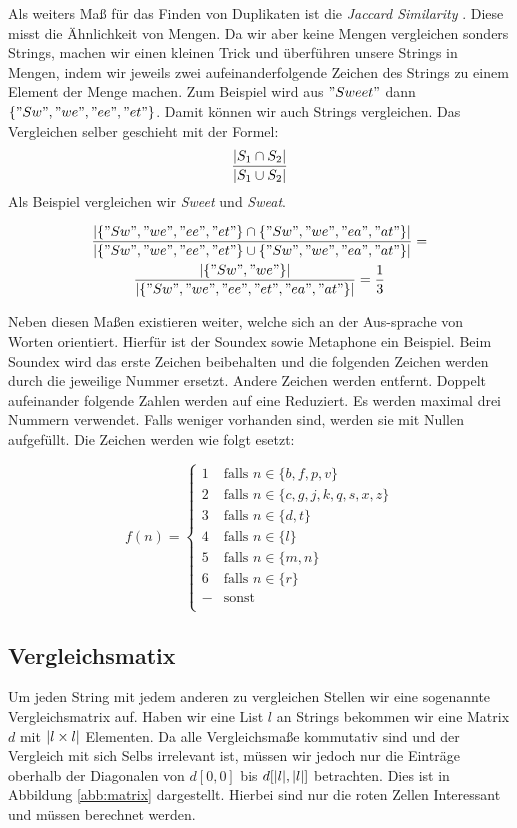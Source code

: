 \documentclass[sigconf]{acmart}
\DeclarePairedDelimiter\abs{\lvert}{\rvert}
\begin{document}
Als weiters Maß für das Finden von Duplikaten ist die
\emph{Jaccard Similarity} \cite[Vgl. 4.1.1]{theobald2008spotsigs}. 
Diese misst die Ähnlichkeit von Mengen. Da wir aber keine Mengen 
vergleichen sonders Strings, machen wir einen
kleinen Trick und überführen unsere Strings in Mengen, indem wir
jeweils zwei aufeinanderfolgende Zeichen des Strings zu einem Element
der Menge machen. Zum Beispiel wird aus $"Sweet"$ dann
$\{"Sw", "we", "ee", "et" \}$. Damit können wir auch Strings vergleichen.
Das Vergleichen selber geschieht mit der Formel:
$$\frac{\abs{S_1 \cap S_2}}{\abs{S_1 \cup S_2}}$$
Als Beispiel vergleichen wir \emph{Sweet} und \emph{Sweat}.

\begin{gather*}
  \frac{
    \abs{\{"Sw", "we", "ee", "et" \} \cap \{"Sw", "we", "ea", "at" \}}
  }{
    \abs{\{"Sw", "we", "ee", "et" \} \cup \{"Sw", "we", "ea", "at" \}}
  }
  = \\
  \frac{
    \abs{\{"Sw", "we"\}}
  }{
    \abs{\{"Sw", "we", "ee", "et", "ea", "at" \}}
  }
  = 
  \frac{1}{3}
\end{gather*}

Neben diesen Maßen existieren weiter, welche sich an der
Aus-sprache von Worten orientiert. Hierfür ist der Soundex 
\cite[Vlg. S. 5]{elmagarmid1} sowie Metaphone 
\cite[Vlg. S. 5]{elmagarmid1} ein Beispiel.
Beim Soundex wird das erste Zeichen beibehalten und die folgenden
Zeichen werden durch die jeweilige Nummer ersetzt. 
Andere Zeichen werden entfernt. Doppelt aufeinander 
folgende Zahlen werden auf eine Reduziert.
Es werden maximal drei Nummern verwendet. Falls weniger vorhanden sind,
werden sie mit Nullen aufgefüllt. Die Zeichen werden
wie folgt esetzt:


\[ f(n) =
  \begin{cases}
    1      & \text{falls } n \in \{b,f,p,v\}\\
    2      & \text{falls } n \in \{c,g,j,k,q,s,x,z\}\\
    3      & \text{falls } n \in \{d,t\}\\
    4      & \text{falls } n \in \{l\}\\
    5      & \text{falls } n \in \{m,n\}\\
    6      & \text{falls } n \in \{r\}\\
    -     & \text{sonst }\\
  \end{cases}
\]




\subsection*{Vergleichsmatix}
Um jeden String mit jedem anderen zu vergleichen Stellen wir eine
sogenannte Vergleichsmatrix auf. Haben wir eine List $l$ an Strings
bekommen wir eine Matrix $d$ mit $\abs{l\times l}$ Elementen. Da alle
Vergleichsmaße kommutativ sind und der Vergleich mit sich Selbs
irrelevant ist, müssen wir jedoch nur die Einträge oberhalb der
Diagonalen von $d[0,0]$ bis $d[\abs{l}, \abs{l}]$ betrachten.
Dies ist in Abbildung \ref{abb:matrix} dargestellt. Hierbei
sind nur die roten Zellen Interessant und müssen berechnet werden.
\end{document}
